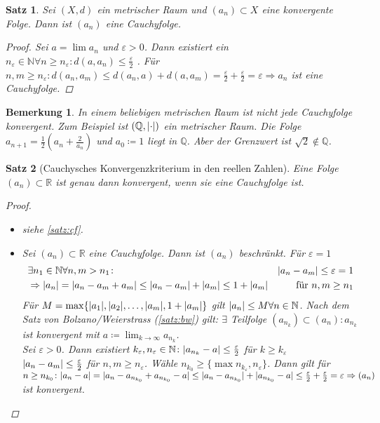 \documentclass[ngerman,titlepage,twoside, parskip=half*]{scrreprt}
\newcommand*{\N}{\mathbb{N}}
\newcommand*{\Q}{\mathbb{Q}}
\newcommand*{\R}{\mathbb{R}}
\theoremstyle{break}
\newtheorem{theorem}{Satz}[section]
\theoremstyle{nonumberbreak}
\newtheorem{remark}{Bemerkung}
\newtheorem{proof}{Beweis:}
\DeclarePairedDelimiter{\abs}{\lvert}{\rvert}
\begin{document}
\begin{theorem}\label{satz:cf}
  Sei $(X,d)$ ein metrischer Raum und $(a_n)\subset X$ eine konvergente Folge.
  Dann ist $(a_n)$ eine Cauchyfolge.
  \begin{proof}
    Sei $a=\lim a_n$ und $\varepsilon>0$. Dann existiert ein
    $n_{\varepsilon}\in \N \forall n\geq n_{\varepsilon}\colon d(a,a_n)\leq
    \frac{\varepsilon}{2}$ . Für $n,m\geq n_{\varepsilon}\colon d(a_n,a_m)\leq
    d(a_n,a)+d(a,a_m)=\frac{\varepsilon}{2} +\frac{\varepsilon}{2}=\varepsilon
    \Rightarrow a_n$ ist eine Cauchyfolge.
  \end{proof}
\end{theorem}

\begin{remark}
  In einem beliebigen metrischen Raum ist \emph{nicht} jede Cauchyfolge
  konvergent. Zum Beispiel ist $(\Q,\abs{\cdot })$ ein metrischer Raum. Die
  Folge $a_{n+1}=\frac{1}{2}(a_n+\frac{2}{a_n})$ und $a_0\coloneqq1$ liegt in
  $\Q$. Aber der Grenzwert ist $\sqrt{2}\notin \Q$.
\end{remark}

\begin{theorem}[Cauchysches Konvergenzkriterium in den reellen Zahlen]
\label{satz:CKonv}
  Eine Folge $(a_n)\subset \R$ ist genau dann konvergent, wenn sie eine
  Cauchyfolge ist.
  \begin{proof}
    \begin{itemize}
     \item["`$\Rightarrow$"'] siehe \autoref{satz:cf}.
     \item["`$\Leftarrow$"'] Sei $(a_n)\subset \R$ eine Cauchyfolge. Dann ist
      $(a_n)$ beschränkt. Für $\varepsilon=1$
    \begin{align*}
      & \exists n_1\in \N \forall n,m >n_1 \colon&\abs{a_n-a_m}\leq\varepsilon =1\\  
      &\Rightarrow \abs{a_n}=\abs{a_n-a_m+a_m}\leq \abs{a_n-a_m}+\abs{a_m}\leq 1+\abs{a_m}
      & \text{ für } n,m\geq n_1
    \end{align*}
    Für $M=\max\{\abs{a_1},\abs{a_2},\ldots, \abs{a_m}, 1+\abs{a_m}\}$ gilt $\abs{a_n}\leq
    M \forall n \in \N$. Nach dem Satz von Bolzano/Weierstrass
    (\autoref{satz:bw}) gilt: $\exists$ Teilfolge $(a_{n_k})\subset
    (a_n)\colon a_{n_k}$ ist konvergent mit $a\coloneqq\lim_{k\rightarrow \infty}
    a_{n_k}$.\\
    Sei $\varepsilon>0$. Dann existiert $k_{\varepsilon}, n_{\varepsilon} \in \N \colon\abs{a_{n_k}-a}\leq \frac{\varepsilon}{2}$
    für $k\geq k_{\varepsilon}$\\
    $\abs{a_n-a_m}\leq \frac{\varepsilon}{2}$ für $n,m \geq n_{\varepsilon}$. Wähle $n_{k_0}\geq \{\max n_{k_{\varepsilon}},
    n_{\varepsilon}\}$. Dann gilt für $n\geq n_{k_0}\colon\abs{a_n-a}=\abs{a_n-a_{n_{k_0}}+a_{n_{k_0}}-a}\leq 
    \abs{a_n-a_{n_{k_0}}}+\abs{a_{n_{k_0}}-a}\leq \frac{\varepsilon}{2}+\frac{\varepsilon}{2}=\varepsilon \Rightarrow (a_n)$
    ist konvergent.
\end{itemize}
  \end{proof}
\end{theorem}
\end{document}
